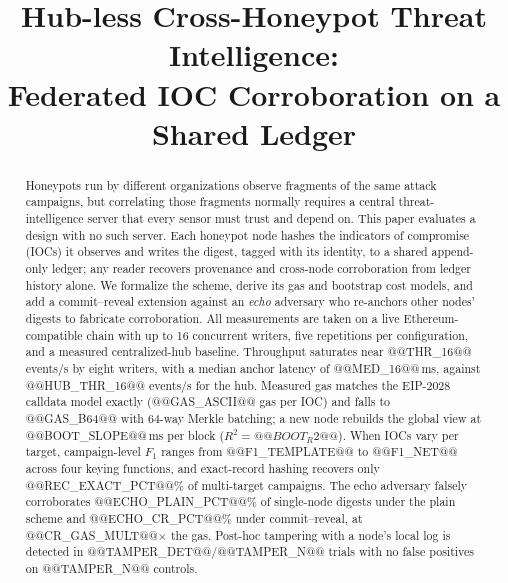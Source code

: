 \documentclass[conference]{IEEEtran}
\begin{document}
\title{Hub-less Cross-Honeypot Threat Intelligence:\\Federated IOC Corroboration on a Shared Ledger}

\author{
}

\maketitle

\begin{abstract}
Honeypots run by different organizations observe fragments of the same attack campaigns, but correlating those fragments normally requires a central threat-intelligence server that every sensor must trust and depend on. This paper evaluates a design with no such server. Each honeypot node hashes the indicators of compromise (IOCs) it observes and writes the digest, tagged with its identity, to a shared append-only ledger; any reader recovers provenance and cross-node corroboration from ledger history alone. We formalize the scheme, derive its gas and bootstrap cost models, and add a commit--reveal extension against an \emph{echo} adversary who re-anchors other nodes' digests to fabricate corroboration. All measurements are taken on a live Ethereum-compatible chain with up to 16 concurrent writers, five repetitions per configuration, and a measured centralized-hub baseline. Throughput saturates near @@THR_16@@ events/s by eight writers, with a median anchor latency of @@MED_16@@\,ms, against @@HUB_THR_16@@ events/s for the hub. Measured gas matches the EIP-2028 calldata model exactly (@@GAS_ASCII@@ gas per IOC) and falls to @@GAS_B64@@ with 64-way Merkle batching; a new node rebuilds the global view at @@BOOT_SLOPE@@\,ms per block ($R^2=@@BOOT_R2@@$). When IOCs vary per target, campaign-level $F_1$ ranges from @@F1_TEMPLATE@@ to @@F1_NET@@ across four keying functions, and exact-record hashing recovers only @@REC_EXACT_PCT@@\% of multi-target campaigns. The echo adversary falsely corroborates @@ECHO_PLAIN_PCT@@\% of single-node digests under the plain scheme and @@ECHO_CR_PCT@@\% under commit--reveal, at @@CR_GAS_MULT@@$\times$ the gas. Post-hoc tampering with a node's local log is detected in @@TAMPER_DET@@/@@TAMPER_N@@ trials with no false positives on @@TAMPER_N@@ controls.
\end{abstract}
\end{document}

